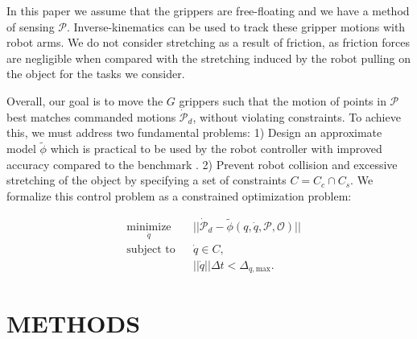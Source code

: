 In this paper we assume that the grippers are free-floating and we have a method of sensing $\mathcal{P}$. 
Inverse-kinematics can be used to track these gripper motions with robot arms. 
We do not consider stretching as a result of friction, as friction forces are negligible when compared with the stretching induced by the robot pulling on the object for the tasks we consider.

Overall, our goal is to move the $G$ grippers such that the motion of points in $\mathcal{P}$ best matches commanded motions $\dot{\mathcal{P}}_d$, without violating constraints. To achieve this, we must address two fundamental problems: 1) Design an approximate model $\tilde{\phi}$ which is practical to be used by the robot controller with improved accuracy compared to the benchmark \cite{Berenson2013}. 2) Prevent robot collision and excessive stretching of the object by specifying a set of constraints $C = C_c\cap C_s$. We formalize this control problem as a constrained optimization problem: 


\begin{equation}
\begin{aligned}
& \underset{\dot{q}}{\text{minimize}}
& & ||\dot{\mathcal{P}}_{d} - \tilde{\phi} (q, \dot{q},\mathcal{P},\mathcal{O})|| \\
& \text{subject to}
& & \dot{q} \in C, \\ 
& & &||\dot{q}||\Delta t < \Delta_{q,\textrm{max}}.
\end{aligned}
\label{Eq: Optimization Problem}
\end{equation}


\section{METHODS}

